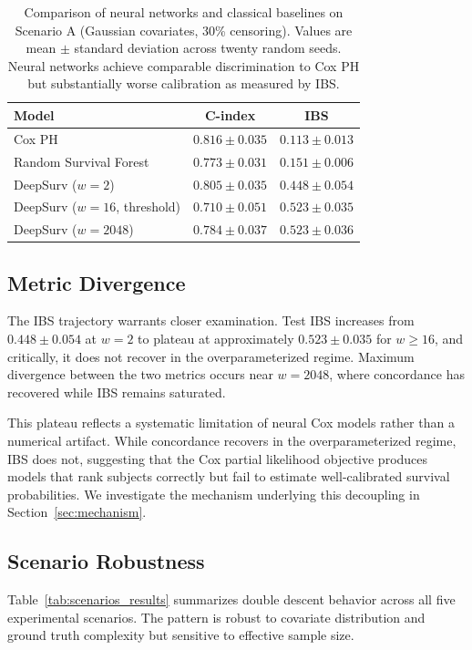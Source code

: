 \documentclass[12pt,a4paper]{article}
\begin{document}
\begin{table}[ht]
\centering
\caption{Comparison of neural networks and classical baselines on Scenario A (Gaussian covariates, 30\% censoring). Values are mean $\pm$ standard deviation across twenty random seeds. Neural networks achieve comparable discrimination to Cox PH but substantially worse calibration as measured by IBS.}
\label{tab:baselines}
\begin{tabular}{lcc}
\toprule
\textbf{Model} & \textbf{C-index} & \textbf{IBS} \\
\midrule
Cox PH & $0.816 \pm 0.035$ & $0.113 \pm 0.013$ \\
Random Survival Forest & $0.773 \pm 0.031$ & $0.151 \pm 0.006$ \\
\midrule
DeepSurv ($w=2$) & $0.805 \pm 0.035$ & $0.448 \pm 0.054$ \\
DeepSurv ($w=16$, threshold) & $0.710 \pm 0.051$ & $0.523 \pm 0.035$ \\
DeepSurv ($w=2048$) & $0.784 \pm 0.037$ & $0.523 \pm 0.036$ \\
\bottomrule
\end{tabular}
\end{table}

\subsection{Metric Divergence}

The IBS trajectory warrants closer examination. Test IBS increases from $0.448 \pm 0.054$ at $w = 2$ to plateau at approximately $0.523 \pm 0.035$ for $w \geq 16$, and critically, it does not recover in the overparameterized regime. Maximum divergence between the two metrics occurs near $w = 2048$, where concordance has recovered while IBS remains saturated.

This plateau reflects a systematic limitation of neural Cox models rather than a numerical artifact. While concordance recovers in the overparameterized regime, IBS does not, suggesting that the Cox partial likelihood objective produces models that rank subjects correctly but fail to estimate well-calibrated survival probabilities. We investigate the mechanism underlying this decoupling in Section~\ref{sec:mechanism}. 

\subsection{Scenario Robustness}

Table~\ref{tab:scenarios_results} summarizes double descent behavior across all five experimental scenarios. The pattern is robust to covariate distribution and ground truth complexity but sensitive to effective sample size.
\end{document}

